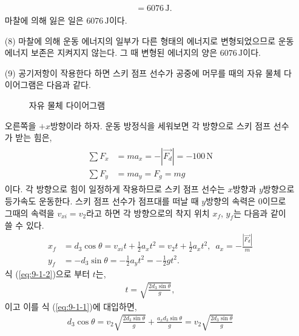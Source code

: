 \documentclass[floatfix,nofootinbib,superscriptaddress,fleqn]{revtex4-2}
\begin{document}
\begin{itemize}
\begin{align}
\begin{split}
      &= 6076\,\mathrm{J}.
    \end{split}
  \end{align}
  마찰에 의해 잃은 일은 $6076\,\mathrm{J}$이다.
  \item[(8)] 마찰에 의해 운동 에너지의 일부가 다른 형태의 에너지로 변형되었으므로 운동 에너지 보존은
   지켜지지 않는다. 그 때 변형된 에너지의 양은 $6076\,\mathrm{J}$이다.
  \item[(9)] 공기저항이 작용한다 하면 스키 점프 선수가 공중에 머무를 때의
   자유 물체 다이어그램은 다음과 같다.
  \begin{figure}[h]
     \caption{자유 물체 다이어그램}
  \end{figure}
  오른쪽을 $+x$방향이라 하자. 운동 방정식을 세워보면 각 방향으로 스키 점프 선수가 받는 힘은,
  \begin{align}
    \begin{split}
      \sum F_x &= ma_x = -|\vec{F_d}| = -100\,\mathrm{N} \\
      \sum F_y &= ma_y = F_g = mg 
    \end{split}
  \end{align}
  이다. 각 방향으로 힘이 일정하게 작용하므로 스키 점프 선수는 
  $x$방향과 $y$방향으로 등가속도 운동한다. 스키 점프 선수가 
  점프대를 떠날 때 $y$방향의 속력은 0이므로 
  그때의 속력을 $v_{xi}=v_2$라고 하면 각 방향으로의 착지 위치 $x_f$, $y_f$는 
  다음과 같이 쓸 수 있다.
  \begin{align}\label{eq:9-1-1}
      x_f &=d_3\cos{\theta}= v_{xi}t+\frac{1}{2}a_xt^2 
      = v_2t+\frac{1}{2}a_xt^2,\,\,\,
      a_x=-\frac{|\vec{F_d}|}{m}  \\ \label{eq:9-1-2}
      y_f &=-d_3\sin{\theta}= -\frac{1}{2}a_yt^2 
      = -\frac{1}{2}gt^2.
  \end{align}
  식 (\ref{eq:9-1-2})으로 부터 $t$는,
  \begin{align}\label{eq:9-2}
    t = \sqrt{\frac{2d_3\sin{\theta}}{g}},
  \end{align}
  이고 이를 식 (\ref{eq:9-1-1})에 대입하면,
  \begin{align}
    d_3\cos{\theta}=v_2\sqrt{\frac{2d_3\sin{\theta}}{g}}
    +\frac{a_xd_3\sin{\theta}}{g}
    =v_2\sqrt{\frac{2d_3\sin{\theta}}{g}}

\end{align}
\end{itemize}
\end{document}
